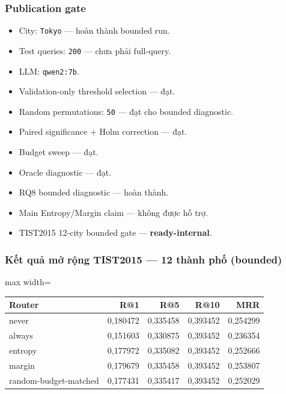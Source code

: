 \subsubsection*{Publication gate}

\begin{itemize}
\item City: \texttt{Tokyo} --- hoàn thành bounded run.
\item Test queries: \texttt{200} --- chưa phải full-query.
\item LLM: \texttt{qwen2:7b}.
\item Validation-only threshold selection --- đạt.
\item Random permutations: \texttt{50} --- đạt cho bounded diagnostic.
\item Paired significance + Holm correction --- đạt.
\item Budget sweep --- đạt.
\item Oracle diagnostic --- đạt.
\item RQ8 bounded diagnostic --- hoàn thành.
\item Main Entropy/Margin claim --- không được hỗ trợ.
\item TIST2015 12-city bounded gate --- \textbf{ready-internal}.
\end{itemize}

\subsubsection*{Kết quả mở rộng TIST2015 --- 12 thành phố (bounded)}

\begin{table}[!htbp]
\centering
\scriptsize
\setlength{\tabcolsep}{2.5pt}
\begin{adjustbox}{max width=\textwidth}
\begin{tabular}{@{}lrrrr@{}}
\toprule
Router & R@1 & R@5 & R@10 & MRR \\
\midrule
never & 0,180472 & 0,335458 & 0,393452 & 0,254299 \\
always & 0,151603 & 0,330875 & 0,393452 & 0,236354 \\
entropy & 0,177972 & 0,335082 & 0,393452 & 0,252666 \\
margin & 0,179679 & 0,335458 & 0,393452 & 0,253807 \\
random-budget-matched & 0,177431 & 0,335417 & 0,393452 & 0,252029 \\
\bottomrule
\end{tabular}
\end{adjustbox}
\end{table}


